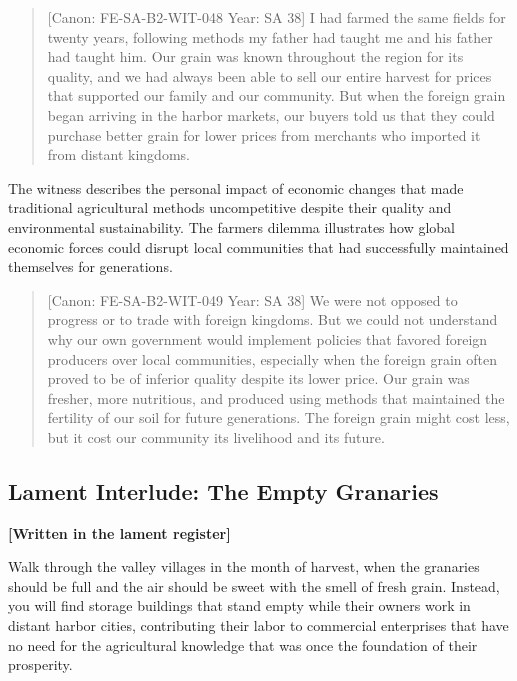 \begin{quote}
{[}Canon: FE-SA-B2-WIT-048 \textbar{} Year: SA 38{]} I had farmed the
same fields for twenty years, following methods my father had taught me
and his father had taught him. Our grain was known throughout the region
for its quality, and we had always been able to sell our entire harvest
for prices that supported our family and our community. But when the
foreign grain began arriving in the harbor markets, our buyers told us
that they could purchase better grain for lower prices from merchants
who imported it from distant kingdoms.
\end{quote}

The witness describes the personal impact of economic changes that made
traditional agricultural methods uncompetitive despite their quality and
environmental sustainability. The farmer\textquotesingle s dilemma
illustrates how global economic forces could disrupt local communities
that had successfully maintained themselves for generations.

\begin{quote}
{[}Canon: FE-SA-B2-WIT-049 \textbar{} Year: SA 38{]} We were not opposed
to progress or to trade with foreign kingdoms. But we could not
understand why our own government would implement policies that favored
foreign producers over local communities, especially when the foreign
grain often proved to be of inferior quality despite its lower price.
Our grain was fresher, more nutritious, and produced using methods that
maintained the fertility of our soil for future generations. The foreign
grain might cost less, but it cost our community its livelihood and its
future.
\end{quote}

\subsection{Lament Interlude: The Empty
Granaries}\label{lament-interlude-the-empty-granaries}

\textbf{{[}Written in the lament register{]}}

Walk through the valley villages in the month of harvest, when the
granaries should be full and the air should be sweet with the smell of
fresh grain. Instead, you will find storage buildings that stand empty
while their owners work in distant harbor cities, contributing their
labor to commercial enterprises that have no need for the agricultural
knowledge that was once the foundation of their prosperity.

